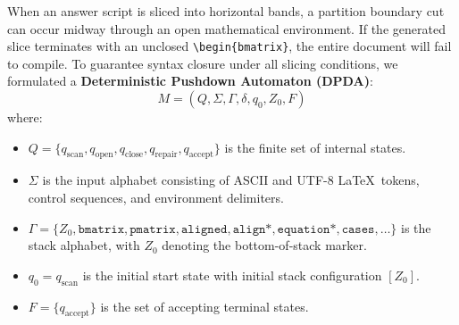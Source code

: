 When an answer script is sliced into horizontal bands, a partition boundary cut can occur midway through an open mathematical environment. If the generated slice terminates with an unclosed \texttt{\textbackslash begin\{bmatrix\}}, the entire document will fail to compile. To guarantee syntax closure under all slicing conditions, we formulated a \textbf{Deterministic Pushdown Automaton (DPDA)}:
\begin{equation}
M = \left( Q, \Sigma, \Gamma, \delta, q_0, Z_0, F \right)
\end{equation}
where:
\begin{itemize}
    \item $Q = \{ q_{\text{scan}}, q_{\text{open}}, q_{\text{close}}, q_{\text{repair}}, q_{\text{accept}} \}$ is the finite set of internal states.
    \item $\Sigma$ is the input alphabet consisting of ASCII and UTF-8 \LaTeX\ tokens, control sequences, and environment delimiters.
    \item $\Gamma = \{ Z_0, \texttt{bmatrix}, \texttt{pmatrix}, \texttt{aligned}, \texttt{align*}, \texttt{equation*}, \texttt{cases}, \dots \}$ is the stack alphabet, with $Z_0$ denoting the bottom-of-stack marker.
    \item $q_0 = q_{\text{scan}}$ is the initial start state with initial stack configuration $[Z_0]$.
    \item $F = \{ q_{\text{accept}} \}$ is the set of accepting terminal states.
\end{itemize}

